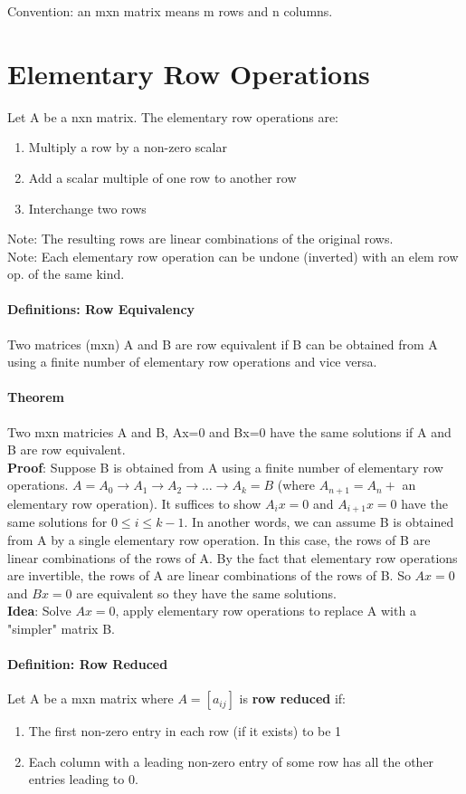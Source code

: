 \documentclass[10pt,letter]{article}
\begin{document}
Convention: an mxn matrix means m rows and n columns. 


\section*{Elementary Row Operations}
Let A be a nxn matrix. The elementary row operations are:
\begin{enumerate}
    \item Multiply a row by a non-zero scalar
    \item Add a scalar multiple of one row to another row 
    \item Interchange two rows 
\end{enumerate}
Note: The resulting rows are linear combinations of the original rows. \\ 
Note: Each elementary row operation can be undone (inverted) with an elem row op. of the same kind. 

\paragraph*{Definitions: Row Equivalency}
Two matrices (mxn) A and B are row equivalent if B can be obtained from A using a finite number of elementary row operations and vice versa. 

\paragraph*{Theorem}
Two mxn matricies A and B, Ax=0 and Bx=0 have the same solutions if A and B are row equivalent. \\ 
\textbf{Proof}: Suppose B is obtained from A using a finite number of elementary row operations. $A=A_0\rightarrow A_1\rightarrow A_2\rightarrow\ldots\rightarrow A_k = B$ (where $A_{n+1}=A_n +$ an elementary row operation). It suffices to show $A_ix=0$ and $A_{i+1}x=0$ have the same solutions for $0\leq i\leq k-1$. In another words, we can assume B is obtained from A by a single elementary row operation. In this case, the rows of B are linear combinations of the rows of A. By the fact that elementary row operations are invertible, the rows of A are linear combinations of the rows of B. So $Ax=0$ and $Bx=0$ are equivalent so they have the same solutions. \\ 
\textbf{Idea}: Solve $Ax=0$, apply elementary row operations to replace A with a "simpler" matrix B. 

\paragraph*{Definition: Row Reduced}
Let A be a mxn matrix where $A=[a_{ij}]$ is \textbf{row reduced} if:
\begin{enumerate}
    \item The first non-zero entry in each row (if it exists) to be 1
    \item Each column with a leading non-zero entry of some row has all the other entries leading to 0. 
\end{enumerate}
\end{document}
